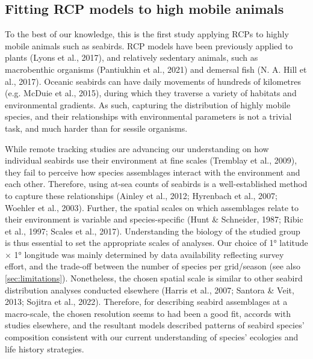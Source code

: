 \documentclass{article}
\begin{document}
\hypertarget{fitting-rcp-models-to-high-mobile-animals}{%
\subsection{Fitting RCP models to high mobile
animals}\label{fitting-rcp-models-to-high-mobile-animals}}

To the best of our knowledge, this is the first study applying RCPs to
highly mobile animals such as seabirds. RCP models have been previously
applied to plants (Lyons et al., 2017), and relatively sedentary
animals, such as macrobenthic organisms (Pantiukhin et al., 2021) and
demersal fish (N. A. Hill et al., 2017). Oceanic seabirds can have daily
movements of hundreds of kilometres (e.g. McDuie et al., 2015), during
which they traverse a variety of habitats and environmental gradients.
As such, capturing the distribution of highly mobile species, and their
relationships with environmental parameters is not a trivial task, and
much harder than for sessile organisms.

While remote tracking studies are advancing our understanding on how
individual seabirds use their environment at fine scales (Tremblay et
al., 2009), they fail to perceive how species assemblages interact with
the environment and each other. Therefore, using at-sea counts of
seabirds is a well-established method to capture these relationships
(Ainley et al., 2012; Hyrenbach et al., 2007; Woehler et al., 2003).
Further, the spatial scales on which assemblages relate to their
environment is variable and species-specific (Hunt \& Schneider, 1987;
Ribic et al., 1997; Scales et al., 2017). Understanding the biology of
the studied group is thus essential to set the appropriate scales of
analyses. Our choice of 1° latitude \(\times\) 1° longitude was mainly
determined by data availability reflecting survey effort, and the
trade-off between the number of species per grid/season (see also
\ref{sec:limitations}). Nonetheless, the chosen spatial scale is similar
to other seabird distribution analyses conducted elsewhere (Harris et
al., 2007; Santora \& Veit, 2013; Sojitra et al., 2022). Therefore, for
describing seabird assemblages at a macro-scale, the chosen resolution
seems to had been a good fit, accords with studies elsewhere, and the
resultant models described patterns of seabird species' composition
consistent with our current understanding of species' ecologies and life
history strategies.
\end{document}
